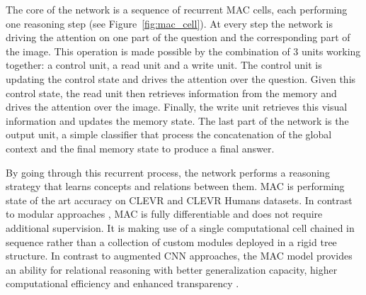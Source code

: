 The core of the network is a sequence of recurrent MAC cells, each performing one reasoning step (see Figure~\ref{fig:mac_cell}). At every step the network is driving the attention on one part of the question and the corresponding part of the image. This operation is made possible by the combination of 3 units working together: a control unit, a read unit and a write unit. The control unit is updating the control state and drives the attention over the question. Given this control state, the read unit then retrieves information from the memory and drives the attention over the image.
Finally, the write unit retrieves this visual information and updates the memory state.
The last part of the network is the output unit,  a simple classifier that process the concatenation of the global context  and the final memory state to produce a final answer.

By going through this recurrent process, the network performs a reasoning strategy that learns concepts and relations between them. MAC is performing state of the art accuracy on CLEVR and CLEVR Humans datasets.
In contrast to modular approaches \cite{andreas2016learning,hu2017learning,johnson2017inferring}, MAC is fully
differentiable and does not require additional supervision. It is making use of a single computational cell chained in sequence rather than a collection of custom modules deployed in a rigid tree structure.
In contrast to augmented CNN approaches, the MAC model provides an ability for relational reasoning with better generalization capacity, higher
computational efficiency and enhanced transparency \cite{hudson2018compositional}.

